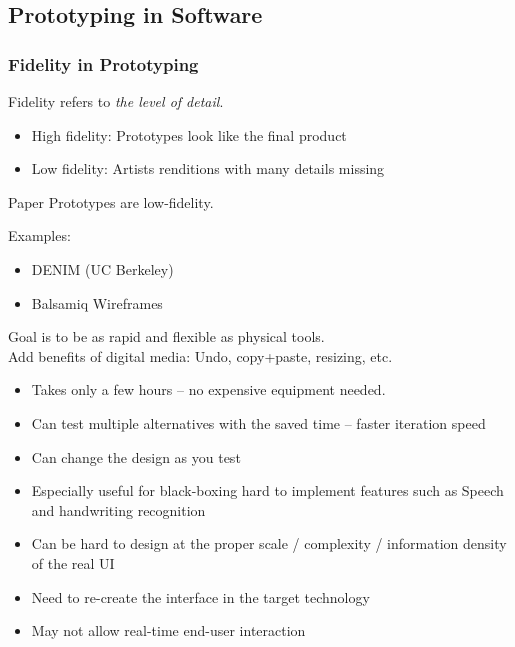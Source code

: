 \subsection{Prototyping in Software}
\subsubsection{Fidelity in Prototyping}
\begin{shaded}
    Fidelity refers to \textit{the level of detail}.
\end{shaded}

\begin{itemize}
    \item High fidelity: Prototypes look like the final product
    \item Low fidelity: Artists renditions with many details  missing
\end{itemize}

Paper Prototypes are low-fidelity. 

Examples:
\begin{itemize}
    \item DENIM (UC Berkeley)
    \item Balsamiq Wireframes
\end{itemize}
Goal is to be as rapid and flexible as physical tools.\\
Add benefits of digital media: Undo, copy+paste, resizing, etc.

\begin{itemize}
    \item Takes only a few hours -- no expensive equipment needed.
    \item Can test multiple alternatives with the saved time -- faster iteration speed
    \item Can change the design as you test
    \item Especially useful for black-boxing hard to implement features such as Speech and handwriting recognition
\end{itemize}

\begin{itemize}
    \item Can be hard to design at the proper scale / complexity  / information density of the real UI
    \item Need to re-create the interface in the target technology
    \item May not allow real-time end-user interaction
\end{itemize}

